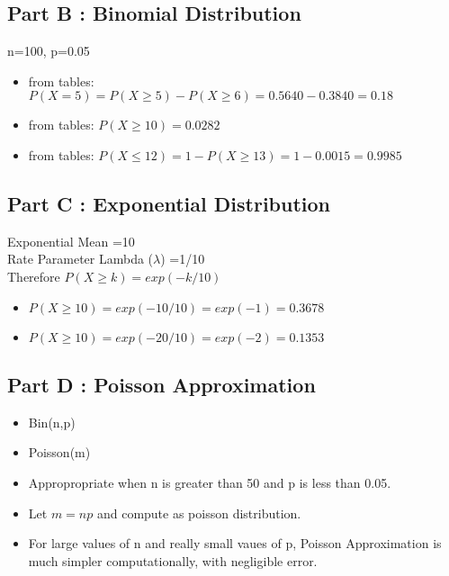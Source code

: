 \subsection*{Part B : Binomial Distribution}
n=100, p=0.05
\begin{itemize}
\item from tables: $P(X=5) = P(X \geq 5) - P(X \geq 6) = 0.5640 - 0.3840 = 0.18$
\item from tables: $P(X \geq 10) = 0.0282$
\item from tables: $P(X \leq 12) = 1-P(X\geq 13) = 1- 0.0015 = 0.9985$
\end{itemize}
\subsection*{Part C : Exponential Distribution}
Exponential Mean =10\\
Rate Parameter Lambda ($\lambda$) =1/10\\
Therefore $P(X \geq k ) = exp(-k/10)$
\begin{itemize}
\item $P(X \geq 10 ) = exp(-10/10) = exp(-1) = 0.3678$
\item $P(X \geq 10 ) = exp(-20/10) = exp(-2) = 0.1353$
\end{itemize}

\subsection*{Part D : Poisson Approximation}
\begin{itemize}
\item Bin(n,p)
\item Poisson(m)
\item Appropropriate when n is greater than 50 and p is less than 0.05.
\item Let $m = np$ and compute as poisson distribution.
\item For large values of n and really small vaues of p, Poisson Approximation is much simpler computationally, with negligible error.
\end{itemize}